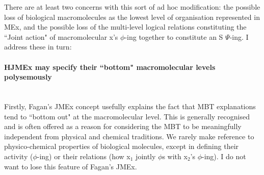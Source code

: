 There are at least two concerns with this sort of ad hoc modification: the possible loss of biological macromolecules as the lowest level of organisation represented in MEx, and the possible loss of the multi-level logical relations constituting the ``Joint action" of macromolecular x's $\phi$-ing together to constitute an S $\Psi$-ing. I address these in turn:

\paragraph{HJMEx may specify their ``bottom" macromolecular levels polysemously}\mbox{}\\
 Firstly, Fagan's JMEx concept usefully explains the fact that MBT explanations tend to ``bottom out" at the macromolecular level. This is generally recognised and is often offered as a reason for considering the MBT to be meaningfully independent from physical and chemical traditions. We rarely make reference to physico-chemical properties of biological molecules, except in defining their activity ($\phi$-ing) or their relations (how x$_1$ jointly $\phi$s with x$_2$'s $\phi$-ing). I do not want to lose this feature of Fagan's JMEx. 
 
